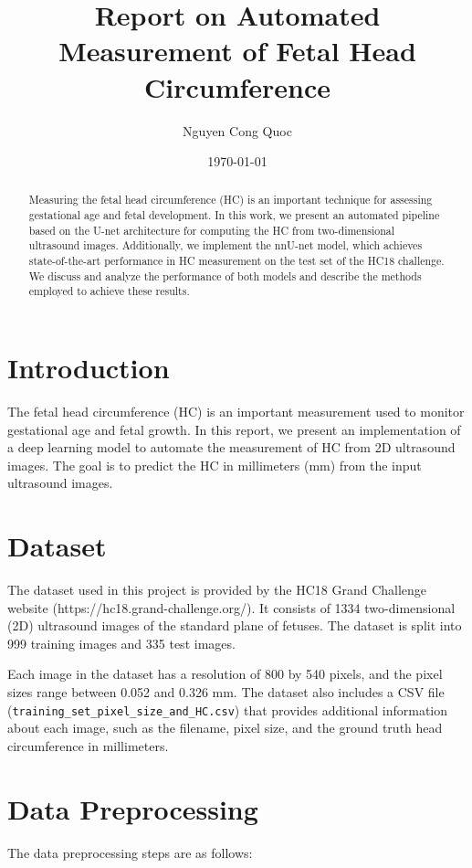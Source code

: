 \documentclass[twocolumn]{article}
\title{Report on Automated Measurement of Fetal Head Circumference}
\author{Nguyen Cong Quoc}
\date{\today}
\begin{document}
\maketitle

\begin{abstract}
Measuring the fetal head circumference (HC) is an important technique for assessing gestational age and fetal development. In this work, we present an automated pipeline based on the U-net architecture for computing the HC from two-dimensional ultrasound images. Additionally, we implement the nnU-net model, which achieves state-of-the-art performance in HC measurement on the test set of the HC18 challenge. We discuss and analyze the performance of both models and describe the methods employed to achieve these results.
\end{abstract}

\section{Introduction}
The fetal head circumference (HC) is an important measurement used to monitor gestational age and fetal growth. In this report, we present an implementation of a deep learning model to automate the measurement of HC from 2D ultrasound images. The goal is to predict the HC in millimeters (mm) from the input ultrasound images.

\section{Dataset}
The dataset used in this project is provided by the HC18 Grand Challenge website (https://hc18.grand-challenge.org/). It consists of 1334 two-dimensional (2D) ultrasound images of the standard plane of fetuses. The dataset is split into 999 training images and 335 test images.

Each image in the dataset has a resolution of 800 by 540 pixels, and the pixel sizes range between 0.052 and 0.326 mm. The dataset also includes a CSV file (\verb|training_set_pixel_size_and_HC.csv|) that provides additional information about each image, such as the filename, pixel size, and the ground truth head circumference in millimeters.

\section{Data Preprocessing}
The data preprocessing steps are as follows:
\end{document}
